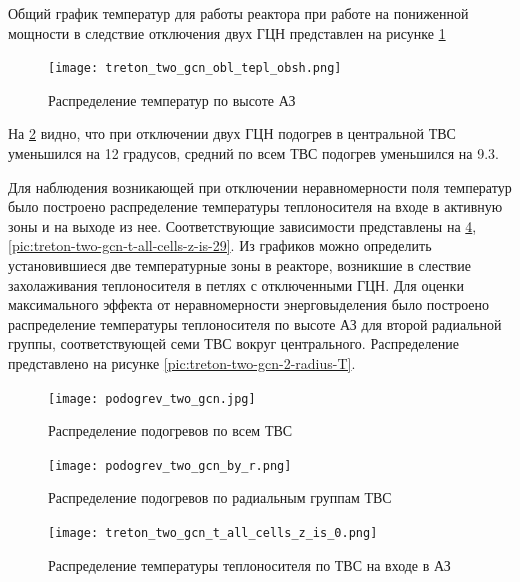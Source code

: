 Общий график температур для работы реактора при работе на пониженной мощности в следствие отключения двух ГЦН представлен на рисунке \ref{pic:treton-two-gcn-obl-tepl-obsh}

\begin{figure}[H]
	\begin{center}
		\texttt{[image: treton\_two\_gcn\_obl\_tepl\_obsh.png]}
		\caption{Распределение температур по высоте АЗ}
		\label{pic:treton-two-gcn-obl-tepl-obsh} %
	\end{center}
\end{figure}

На \ref{pic:podogrev-two-gcn} видно, что при отключении двух ГЦН подогрев в центральной ТВС уменьшился на 12 градусов, средний по всем ТВС подогрев уменьшился на 9.3. 

Для наблюдения возникающей при отключении неравномерности поля температур было построено распределение температуры теплоносителя на входе в активную зоны и на выходе из нее. Соответствующие зависимости представлены на \ref{pic:treton-two-gcn-t-all-cells-z-is-0}, \ref{pic:treton-two-gcn-t-all-cells-z-is-29}. Из графиков можно определить установившиеся две температурные зоны в реакторе, возникшие в слествие захолаживания теплоносителя в петлях с отключенными ГЦН. Для оценки максимального эффекта от неравномерности энерговыделения было построено распределение температуры теплоносителя по высоте АЗ для второй радиальной группы, соответствующей семи ТВС вокруг центрального. Распределение представлено на рисунке \ref{pic:treton-two-gcn-2-radius-T}.

\begin{figure}[H]
	\begin{center}
		\texttt{[image: podogrev\_two\_gcn.jpg]}
		\caption{Распределение подогревов по всем ТВС}
		\label{pic:podogrev-two-gcn} %
	\end{center}
\end{figure}

\begin{figure}[H]
	\begin{center}
		\texttt{[image: podogrev\_two\_gcn\_by\_r.png]}
		\caption{Распределение подогревов по радиальным группам ТВС}
		\label{pic:podogrev-two-gcn-by-r} %
	\end{center}
\end{figure}

\begin{figure}[H]
	\begin{center}
		\texttt{[image: treton\_two\_gcn\_t\_all\_cells\_z\_is\_0.png]}
		\caption{Распределение температуры теплоносителя по ТВС на входе в АЗ}
		\label{pic:treton-two-gcn-t-all-cells-z-is-0} %
	\end{center}
\end{figure}

